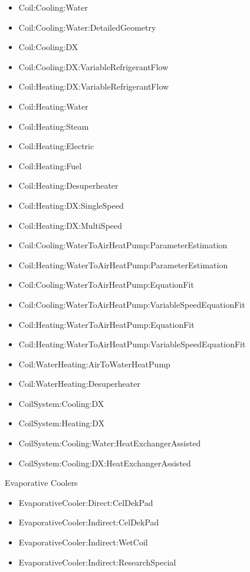 \begin{itemize}
\tightlist
\item
  Coil:Cooling:Water
\item
  Coil:Cooling:Water:DetailedGeometry
\item
  Coil:Cooling:DX
\item
  Coil:Cooling:DX:VariableRefrigerantFlow
\item
  Coil:Heating:DX:VariableRefrigerantFlow
\item
  Coil:Heating:Water
\item
  Coil:Heating:Steam
\item
  Coil:Heating:Electric
\item
  Coil:Heating:Fuel
\item
  Coil:Heating:Desuperheater
\item
  Coil:Heating:DX:SingleSpeed
\item
  Coil:Heating:DX:MultiSpeed
\item
  Coil:Cooling:WaterToAirHeatPump:ParameterEstimation
\item
  Coil:Heating:WaterToAirHeatPump:ParameterEstimation
\item
  Coil:Cooling:WaterToAirHeatPump:EquationFit
\item
  Coil:Cooling:WaterToAirHeatPump:VariableSpeedEquationFit
\item
  Coil:Heating:WaterToAirHeatPump:EquationFit
\item
  Coil:Heating:WaterToAirHeatPump:VariableSpeedEquationFit
\item
  Coil:WaterHeating:AirToWaterHeatPump
\item
  Coil:WaterHeating:Desuperheater
\item
  CoilSystem:Cooling:DX
\item
  CoilSystem:Heating:DX
\item
  CoilSystem:Cooling:Water:HeatExchangerAssisted
\item
  CoilSystem:Cooling:DX:HeatExchangerAssisted
\end{itemize}

Evaporative Coolers

\begin{itemize}
\tightlist
\item
  EvaporativeCooler:Direct:CelDekPad
\item
  EvaporativeCooler:Indirect:CelDekPad
\item
  EvaporativeCooler:Indirect:WetCoil
\item
  EvaporativeCooler:Indirect:ResearchSpecial
\end{itemize}

